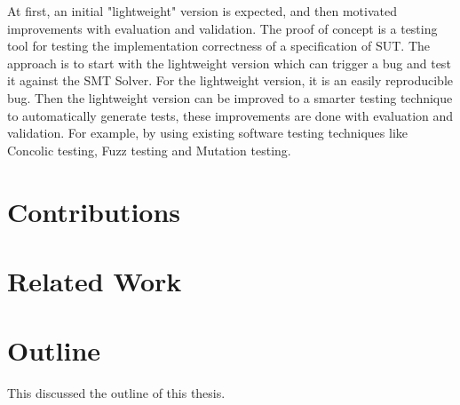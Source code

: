 At first, an initial "lightweight" version is expected, and then motivated improvements with evaluation and validation. The proof of concept is a testing tool for testing the implementation correctness of a specification of SUT. The approach is to start with the lightweight version which can trigger a bug and test it against the SMT Solver. For the lightweight version, it is an easily reproducible bug. Then the lightweight version can be improved to a smarter testing technique to automatically generate tests, these improvements are done with evaluation and validation. For example, by using existing software testing techniques like Concolic testing, Fuzz testing and Mutation testing.

\section{Contributions}

\section{Related Work}

\section{Outline}
This discussed the outline of this thesis.